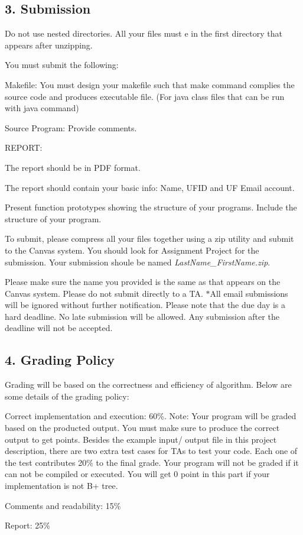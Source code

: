 \subsection*{3. Submission}

Do not use nested directories. All your files must e in the first directory that appears after unzipping.

You must submit the following\+:


\begin{DoxyEnumerate}
\item Makefile\+: You must design your makefile such that \textquotesingle{}make\textquotesingle{} command complies the source code and produces executable file. (For java class files that can be run with java command)
\item Source Program\+: Provide comments.
\item R\+E\+P\+O\+RT\+:
\end{DoxyEnumerate}
\begin{DoxyItemize}
\item The report should be in P\+DF format.
\item The report should contain your basic info\+: Name, U\+F\+ID and UF Email account.
\item Present function prototypes showing the structure of your programs. Include the structure of your program.
\end{DoxyItemize}

To submit, please compress all your files together using a zip utility and submit to the Canvas system. You should look for Assignment Project for the submission. Your submission shoule be named {\itshape Last\+Name\+\_\+\+First\+Name.\+zip}.

Please make sure the name you provided is the same as that appears on the Canvas system. Please do not submit directly to a TA. $\ast$\+All email submissions will be ignored without further notification. Please note that the due day is a hard deadline. No late submission will be allowed. Any submission after the deadline will not be accepted.

\subsection*{4. Grading Policy}

Grading will be based on the correctness and efficiency of algorithm. Below are some details of the grading policy\+:
\begin{DoxyItemize}
\item Correct implementation and execution\+: 60\%. Note\+: Your program will be graded based on the producted output. You must make sure to produce the correct output to get points. Besides the example input/ output file in this project description, there are two extra test cases for T\+As to test your code. Each one of the test contributes 20\% to the final grade. Your program will not be graded if it can not be compiled or executed. You will get 0 point in this part if your implementation is not B+ tree.
\item Comments and readability\+: 15\%
\item Report\+: 25\%
\end{DoxyItemize}

